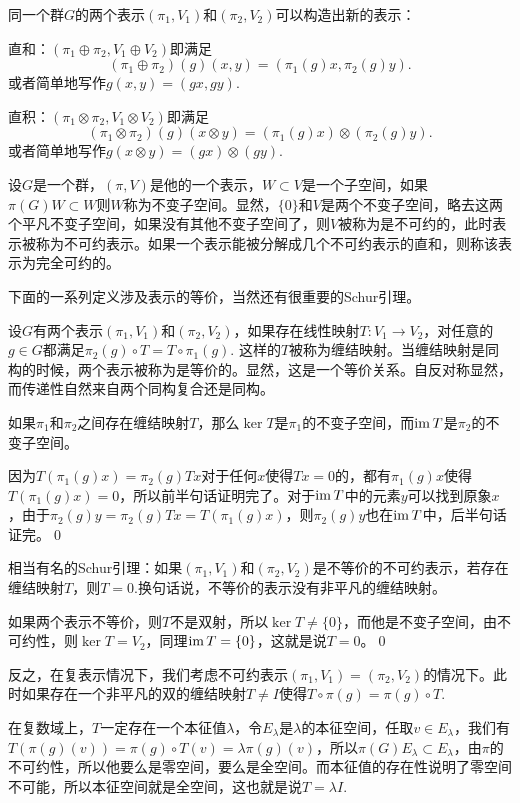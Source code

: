 \para 同一个群$G$的两个表示$(\pi_1,V_1)$和$(\pi_2,V_2)$可以构造出新的表示：

 直和：$(\pi_1\oplus \pi_2,V_1\oplus V_2)$即满足
\[
	(\pi_1\oplus \pi_2)(g)(x,y)=(\pi_1(g)x,\pi_2(g)y).
\]
或者简单地写作$g(x,y)=(gx,gy)$.

 直积：$(\pi_1\otimes \pi_2,V_1\otimes V_2)$即满足
\[
	(\pi_1\otimes \pi_2)(g)(x\otimes y)=(\pi_1(g)x)\otimes (\pi_2(g)y).
\]
或者简单地写作$g(x\otimes y)=(gx)\otimes(gy)$.

\para 设$G$是一个群，$(\pi,V)$是他的一个表示，$W\subset V$是一个子空间，如果$\pi(G)W\subset W$则$W$称为不变子空间。显然，$\{0\}$和$V$是两个不变子空间，略去这两个平凡不变子空间，如果没有其他不变子空间了，则$V$被称为是不可约的，此时表示被称为不可约表示。如果一个表示能被分解成几个不可约表示的直和，则称该表示为完全可约的。

下面的一系列定义涉及表示的等价，当然还有很重要的Schur引理。

\para 设$G$有两个表示$(\pi_1,V_1)$和$(\pi_2,V_2)$，如果存在线性映射$T:V_1\to V_2$，对任意的$g\in G$都满足$\pi_2(g)\circ T=T\circ \pi_1(g)$. 这样的$T$被称为缠结映射。当缠结映射是同构的时候，两个表示被称为是等价的。显然，这是一个等价关系。自反对称显然，而传递性自然来自两个同构复合还是同构。

\lem 如果$\pi_1$和$\pi_2$之间存在缠结映射$T$，那么$\ker T$是$\pi_1$的不变子空间，而$\operatorname{im} T$是$\pi_2$的不变子空间。

\proof 因为$T(\pi_1(g)x)=\pi_2(g)Tx$对于任何$x$使得$Tx=0$的，都有$\pi_1(g)x$使得$T(\pi_1(g)x)=0$，所以前半句话证明完了。对于$\operatorname{im} T$中的元素$y$可以找到原象$x$，由于$\pi_2(g)y=\pi_2(g)Tx=T(\pi_1(g)x)$，则$\pi_2(g)y$也在$\operatorname{im} T$中，后半句话证完。\qed

\lem 相当有名的Schur引理：如果$(\pi_1,V_1)$和$(\pi_2,V_2)$是不等价的不可约表示，若存在缠结映射$T$，则$T=0$.换句话说，不等价的表示没有非平凡的缠结映射。

\proof 如果两个表示不等价，则$T$不是双射，所以$\ker T\neq \{0\}$，而他是不变子空间，由不可约性，则$\ker T= V_2$，同理$\operatorname{im}  T= \{0\}$，这就是说$T=0$。\qed

\para 反之，在复表示情况下，我们考虑不可约表示$(\pi_1,V_1)=(\pi_2,V_2)$的情况下。此时如果存在一个非平凡的双的缠结映射$T\neq I$使得$T\circ \pi(g)=\pi(g)\circ T$.

在复数域上，$T$一定存在一个本征值$\lambda$，令$E_\lambda$是$\lambda$的本征空间，任取$v\in E_\lambda$，我们有$T(\pi(g)(v))=\pi(g)\circ T(v)=\lambda\pi(g)(v)$，所以$\pi(G)E_\lambda\subset E_\lambda$，由$\pi$的不可约性，所以他要么是零空间，要么是全空间。而本征值的存在性说明了零空间不可能，所以本征空间就是全空间，这也就是说$T=\lambda I$.


